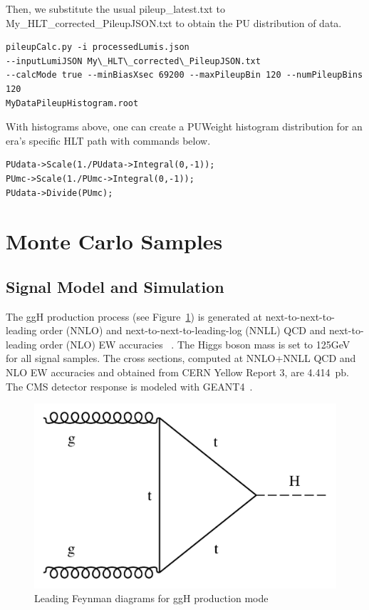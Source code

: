 Then, we substitute the usual pileup\_latest.txt to My\_HLT\_corrected\_PileupJSON.txt to obtain the PU distribution of data. 

\begin{verbatim}
pileupCalc.py -i processedLumis.json 
--inputLumiJSON My\_HLT\_corrected\_PileupJSON.txt  
--calcMode true --minBiasXsec 69200 --maxPileupBin 120 --numPileupBins 120 
MyDataPileupHistogram.root
\end{verbatim}

With histograms above, one can create a PUWeight histogram distribution for an era's specific HLT path with commands below.
\begin{verbatim}
PUdata->Scale(1./PUdata->Integral(0,-1));
PUmc->Scale(1./PUmc->Integral(0,-1));
PUdata->Divide(PUmc);
\end{verbatim}

\section{Monte Carlo Samples}

\subsection{Signal Model and Simulation}

The ggH production process (see Figure~\ref{fig:feynmanggH}) is generated at next-to-next-to-leading order (NNLO) and next-to-next-to-leading-log (NNLL) QCD and next-to-leading order (NLO) EW accuracies ~\cite{Heinemeyer:2013xd}.
The Higgs boson mass is set to 125GeV for all signal samples.
The cross sections, computed at NNLO+NNLL QCD and NLO EW accuracies and obtained from CERN Yellow Report 3,
are 4.414~$\mathrm{pb}$. The CMS detector response is modeled with GEANT4~\cite{Agostinelli:2002hh}.

\begin{figure}[h!]
  \caption{Leading Feynman diagrams for ggH production mode}
  \label{fig:feynmanggH}
  \centering
  \includegraphics[width=0.47\linewidth]{figs/feynmanggH.pdf}

\end{figure}


